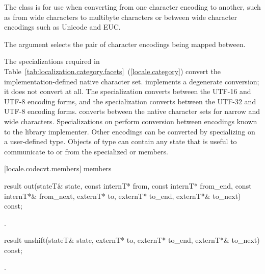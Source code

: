 \pnum
The class
is for use when
converting from one character encoding to another, such as from wide characters
to multibyte  characters or between wide character encodings such as
Unicode and EUC.

\pnum
The
argument selects the pair of character encodings being mapped between.

\pnum
The specializations required in Table~\ref{tab:localization.category.facets}~(\ref{locale.category})
convert the implementation-defined native character set.
implements a degenerate conversion;
it does not convert at all.
The specialization  
converts between the UTF-16 and UTF-8 encoding forms, and
the specialization  
converts between the UTF-32 and UTF-8 encoding forms.
converts between the native character sets for narrow and wide characters.
Specializations on
perform conversion between encodings known to the library implementer.
Other encodings can be converted by specializing on a user-defined
type.
Objects of type
can contain any state that is useful to communicate to or from
the specialized
or
members.

[locale.codecvt.members]{ members}

%
\begin{itemdecl}
result out(stateT& state,
  const internT* from, const internT* from_end, const internT*& from_next,
        externT* to, externT* to_end, externT*& to_next) const;
\end{itemdecl}

\begin{itemdescr}
\pnum
\returns
{}.
\end{itemdescr}

%
\begin{itemdecl}
result unshift(stateT& state,
        externT* to, externT* to_end, externT*& to_next) const;
\end{itemdecl}

\begin{itemdescr}
\pnum
\returns
{}.
\end{itemdescr}

